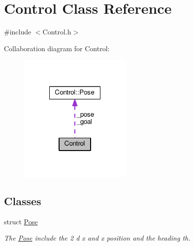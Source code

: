 \hypertarget{classControl}{\section{Control Class Reference}
\label{classControl}
}


{\ttfamily \#include $<$Control.\-h$>$}



Collaboration diagram for Control\-:\nopagebreak
\begin{figure}[H]
\begin{center}
\leavevmode
\includegraphics[width=156pt]{classControl__coll__graph}
\end{center}
\end{figure}
\subsection*{Classes}
\begin{DoxyCompactItemize}
\item 
struct \hyperlink{structControl_1_1Pose}{Pose}
\begin{DoxyCompactList}\small\item\em The \hyperlink{structControl_1_1Pose}{Pose} include the 2 d x and x position and the heading th. \end{DoxyCompactList}\end{DoxyCompactItemize}
